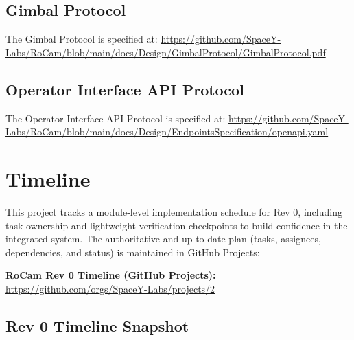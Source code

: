 \documentclass[12pt, titlepage]{article}
\begin{document}
\subsection{Gimbal Protocol}

The Gimbal Protocol is specified at:
\url{https://github.com/SpaceY-Labs/RoCam/blob/main/docs/Design/GimbalProtocol/GimbalProtocol.pdf}

\subsection{Operator Interface API Protocol}

The Operator Interface API Protocol is specified at:
\url{https://github.com/SpaceY-Labs/RoCam/blob/main/docs/Design/EndpointsSpecification/openapi.yaml}

\section{Timeline} \label{SecTimeline}

This project tracks a module-level implementation schedule for Rev 0, including
task ownership and lightweight verification checkpoints to build confidence in
the integrated system. The authoritative and up-to-date plan (tasks, assignees,
dependencies, and status) is maintained in GitHub Projects:

\medskip
\noindent\textbf{RoCam Rev 0 Timeline (GitHub Projects):}
\url{https://github.com/orgs/SpaceY-Labs/projects/2}
\medskip


\subsection{Rev 0 Timeline Snapshot}
\end{document}

